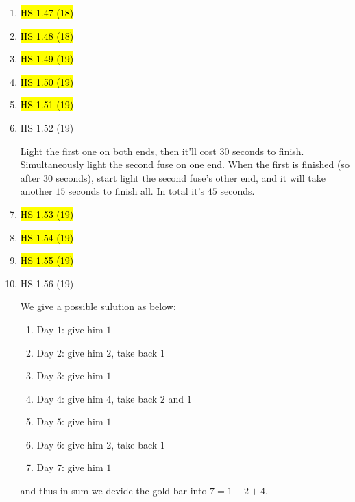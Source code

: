 \documentclass[11pt]{article}
\newcommand{\E}{\text{E}}
\newcommand{\bs}{\boldsymbol}
\newenvironment{note}{\begin{enumerate}[leftmargin=1em,topsep=0pt,noitemsep]}{\end{enumerate}}
\newenvironment{nnote}{\begin{enumerate}[leftmargin=.95em,topsep=0pt,noitemsep,label=$\bs{\cdot}$]}{\end{enumerate}}
\newcommand{\solution}{\boxed{\textbf{SOLUTION}}\hspace{.5em}}
\begin{document}
\begin{spacing}{1.1}
\begin{note}
\begin{verbatim}
double cache[X+1][Y+1];

void printMatrix() {
    for (int i=0; i<X+1; ++i) {
        for (int j=0; j<Y+1; ++j)
            cout << cache[i][j] << " ";
        cout << endl;
    }
}

void fillMatrix() {
    for (int i=0; i<X+1; ++i) {
        for (int j=0; j<Y+1; ++j)
            cache[i][j] = value;
    }
}

double E(int x, int y) {
    if (x == 0) return 0;
    if (y == 0) return x;
    if (cache[x][y] != value) return cache[x][y];
    int t = x + y;
    double rx = (double)x / (double)t;
    double ry = (double)y / (double)t;
    double ans = max(0., rx * (1 + E(x - 1, y)) + ry * (-1 + E(x, y - 1)));
    cache[x][y] = ans;
    return ans;
}

int main() {
    fillMatrix();
    cout << E(X, Y) << endl;
    return 0;
}
\end{verbatim}
which gives $\E(26,26)=2.62448$ eventually.


\item \hl{HS 1.47 (18)}
\item \hl{HS 1.48 (18)}
\item \hl{HS 1.49 (19)}
\item \hl{HS 1.50 (19)}
\item \hl{HS 1.51 (19)}

\item HS 1.52 (19)

\solution Light the first one on both ends, then it'll cost $30$ seconds to finish. Simultaneously light the second fuse on one end. When the first is finished (so after $30$ seconds), start light the second fuse's other end, and it will take another $15$ seconds to finish all. In total it's $45$ seconds.

\item \hl{HS 1.53 (19)}
\item \hl{HS 1.54 (19)}
\item \hl{HS 1.55 (19)}

\item HS 1.56 (19)

\solution We give a possible sulution as below:
\begin{nnote}
\item Day $1$: give him $1$
\item Day $2$: give him $2$, take back $1$
\item Day $3$: give him $1$
\item Day $4$: give him $4$, take back $2$ and $1$
\item Day $5$: give him $1$
\item Day $6$: give him $2$, take back $1$
\item Day $7$: give him $1$
\end{nnote}
and thus in sum we devide the gold bar into $7=1+2+4$.


\end{note}
\end{spacing}
\end{document}
